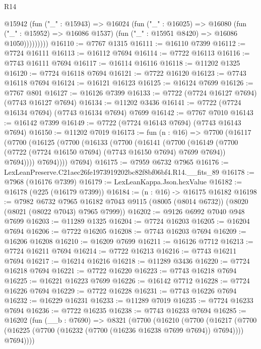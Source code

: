 \begin{lexlean}{R14}
\begin{coremodule}
              @15942
                (fun ("_" : @15943) =>
                @16024
                  (fun ("_" : @16025) =>
                  @16080
                    (fun ("_" : @15952) => @16086 @1537)
                    (fun ("_" : @15951 @8420) => @16086 @1050)))))))))
@16110 := @7767 @1315
@16111 := @16110 @7399
@16112 := @7724 @16111
@16113 := @16112 @7694
@16114 := @7722 @16113
@16116 := @7743 @16111 @7694
@16117 := @16114 @16116
@16118 := @11202 @1325
@16120 := @7724 @16118 @7694
@16121 := @7722 @16120
@16123 := @7743 @16118 @7694
@16124 := @16121 @16123
@16125 := @16124 @7699
@16126 := @7767 @801
@16127 := @16126 @7399
@16133 := @7722 (@7724 @16127 @7694) (@7743 @16127 @7694)
@16134 := @11202 @3436
@16141 := @7722 (@7724 @16134 @7694) (@7743 @16134 @7694) @7699
@16142 := @7767 @7010
@16143 := @16142 @7399
@16149 := @7722 (@7724 @16143 @7694) (@7743 @16143 @7694)
@16150 := @11202 @7019
@16173 := fun (n : @16) =>
  @7700
    (@16117
      (@7700
        (@16125
          (@7700
            (@16133
              (@7700
                (@16141
                  (@7700
                    (@16149
                      (@7700 (@7722 (@7724 @16150 @7694) (@7743 @16150 @7694) @7699 @7694))
                      @7694))))
              @7694))))
      @7694)
@16175 := @7959 @6732 @7965
@16176 := LexLeanPreserve.C21aec26fe1973919202bc82f8bf06bf4.R14.__fits_89
@16178 := @7968 (@16176 @7399)
@16179 := LexLeanKappa.Json.hexValue
@16182 := @16178 (@225 (@16179 @7399))
@16184 := (n : @16) -> @16175 @16182
@16198 := @7982
    @6732
    @7965
    @16182
    @7043
    @9115
    (@8005 (@8014 @6732))
    (@8020 (@8021 (@8022 @7043) @7965 @7999))
@16202 := @9126 @6992 @7040 @948 @7699
@16203 := @11289 @1325
@16204 := @7724 @16203
@16205 := @16204 @7694
@16206 := @7722 @16205
@16208 := @7743 @16203 @7694
@16209 := @16206 @16208
@16210 := @16209 @7699
@16211 := @16126 @7712
@16213 := @7724 @16211 @7694
@16214 := @7722 @16213
@16216 := @7743 @16211 @7694
@16217 := @16214 @16216
@16218 := @11289 @3436
@16220 := @7724 @16218 @7694
@16221 := @7722 @16220
@16223 := @7743 @16218 @7694
@16225 := @16221 @16223 @7699
@16226 := @16142 @7712
@16228 := @7724 @16226 @7694
@16229 := @7722 @16228
@16231 := @7743 @16226 @7694
@16232 := @16229 @16231
@16233 := @11289 @7019
@16235 := @7724 @16233 @7694
@16236 := @7722 @16235
@16238 := @7743 @16233 @7694
@16285 := @16202
    (fun (__b : @7690) =>
    @8321
      (@7700
        (@16210
          (@7700
            (@16217
              (@7700 (@16225 (@7700 (@16232 (@7700 (@16236 @16238 @7699 @7694)) @7694))))
              @7694))))

\end{coremodule}
\end{lexlean}
